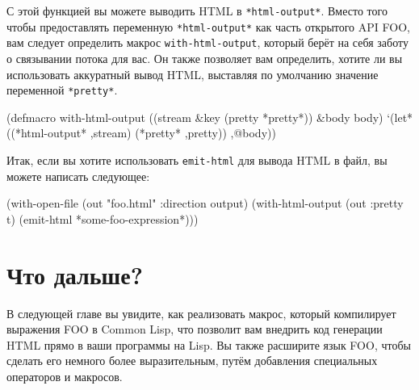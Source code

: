 С этой функцией вы можете выводить HTML в \lstinline{*html-output*}. Вместо того чтобы
предоставлять переменную \lstinline{*html-output*} как часть открытого API FOO, вам следует
определить макрос \lstinline{with-html-output}, который берёт на себя заботу о связывании
потока для вас. Он также позволяет вам определить, хотите ли вы использовать аккуратный
вывод HTML, выставляя по умолчанию значение переменной \lstinline{*pretty*}.

\begin{myverb}
(defmacro with-html-output ((stream &key (pretty *pretty*)) &body body)
  `(let* ((*html-output* ,stream)
          (*pretty* ,pretty))
    ,@body))
\end{myverb}

Итак, если вы хотите использовать \lstinline{emit-html} для вывода HTML в файл, вы можете
написать следующее:

\begin{myverb}
(with-open-file (out "foo.html" :direction output)
  (with-html-output (out :pretty t)
    (emit-html *some-foo-expression*)))
\end{myverb}

\section{Что дальше?}

В следующей главе вы увидите, как реализовать макрос, который компилирует выражения FOO в
Common Lisp, что позволит вам внедрить код генерации HTML прямо в ваши программы на Lisp. Вы
также расширите язык FOO, чтобы сделать его немного более выразительным, путём добавления
специальных операторов и макросов.

